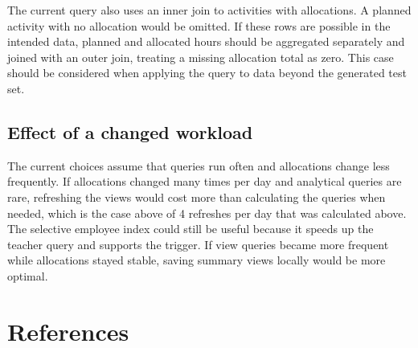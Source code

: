 \documentclass[a4paper]{scrartcl}
\renewcommand{\_}{\textunderscore\allowbreak}
\begin{document}
The current query also uses an inner join to activities with allocations. A planned activity with no allocation would be omitted. If these rows are possible in the intended data, planned and allocated hours should be aggregated separately and joined with an outer join, treating a missing allocation total as zero. This case should be considered when applying the query to data beyond the generated test set.

\subsection{Effect of a changed workload}

The current choices assume that queries run often and allocations change less frequently. If allocations changed many times per day and analytical queries are rare, refreshing the views would cost more than calculating the queries when needed, which is the case above of 4 refreshes per day that was calculated above. The selective employee index could still be useful because it speeds up the teacher query and supports the trigger. If view queries became more frequent while allocations stayed stable, saving summary views locally would be more optimal.






\section{References}
\label{sec:references}
\end{document}
